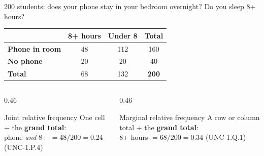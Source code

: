 \documentclass[aspectratio=169, 11pt]{beamer}
\begin{document}
\begin{frame}[t, plain]
  200 students: does your phone stay in your bedroom overnight? Do you sleep 8+ hours?
  \vspace{6pt}
  \begin{center}
  \renewcommand{\arraystretch}{1.25}
  \begin{tabular}{l | c c | c}
     & \textbf{8+ hours} & \textbf{Under 8} & \textbf{Total} \\ \hline
    \textbf{Phone in room} & 48 & 112 & 160 \\
    \textbf{No phone} & 20 & 20 & 40 \\ \hline
    \textbf{Total} & 68 & 132 & \textbf{200} \\
  \end{tabular}
  \end{center}
  \vspace{6pt}
  \begin{columns}[t]
    \begin{column}{0.46\textwidth}
      \begin{block}{Joint relative frequency}
        One cell $\div$ the \textbf{grand total}: \\
        phone \emph{and} 8+ $= 48/200 = 0.24$ (UNC-1.P.4)
      \end{block}
    \end{column}
    \begin{column}{0.46\textwidth}
      \begin{block}{Marginal relative frequency}
        A row or column total $\div$ the \textbf{grand total}: \\
        8+ hours $= 68/200 = 0.34$ (UNC-1.Q.1)
      \end{block}
    \end{column}
  \end{columns}
\end{frame}
\end{document}
